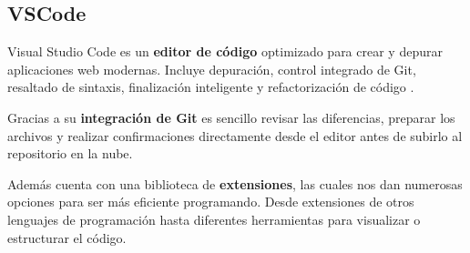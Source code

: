 \documentclass[12pt,twoside,titlepage]{report}
\begin{document}
\subsection{VSCode}
\label{sec:VSCode}

Visual Studio Code es un \textbf{editor de código} optimizado para crear y depurar aplicaciones web modernas. Incluye depuración, control integrado de Git, resaltado de sintaxis, finalización inteligente y refactorización de código \cite{vscode}.

Gracias a su \textbf{integración de Git} es sencillo revisar las diferencias, preparar los archivos y realizar confirmaciones directamente desde el editor antes de subirlo al repositorio en la nube.

Además cuenta con una biblioteca de \textbf{extensiones}, las cuales nos dan numerosas opciones para ser más eficiente programando. Desde extensiones de otros lenguajes de programación hasta diferentes herramientas para visualizar o estructurar el código.
\end{document}

